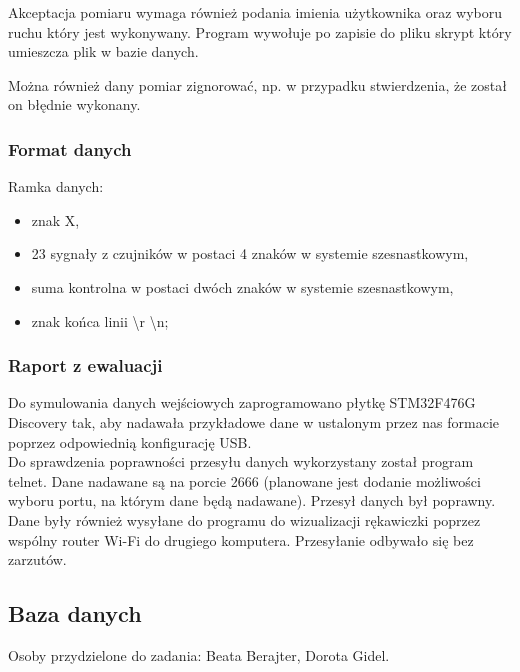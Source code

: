 \documentclass{article}
\begin{document}
Akceptacja pomiaru wymaga również podania imienia użytkownika oraz wyboru ruchu który jest wykonywany. Program wywołuje po zapisie do pliku skrypt który umieszcza plik w bazie danych.

Można również dany pomiar zignorować, np. w przypadku stwierdzenia, że został on błędnie wykonany.

\subsubsection{Format danych}
Ramka danych:
\begin{itemize}
    \item znak X,
    \item 23 sygnały z czujników w postaci 4 znaków w systemie szesnastkowym,
    \item suma kontrolna w postaci dwóch znaków w systemie szesnastkowym,
    \item znak końca linii \textbackslash r \textbackslash n;
\end{itemize}

\subsubsection{Raport z ewaluacji}
Do symulowania danych wejściowych zaprogramowano płytkę STM32F476G Discovery tak, aby nadawała przykładowe dane w ustalonym przez nas formacie poprzez odpowiednią konfigurację USB. \\
Do sprawdzenia poprawności przesyłu danych wykorzystany został program telnet. Dane nadawane są na porcie 2666 (planowane jest dodanie możliwości wyboru portu, na którym dane będą nadawane). Przesył danych był poprawny. \\
Dane były również wysyłane do programu do wizualizacji rękawiczki poprzez wspólny router Wi-Fi do drugiego komputera. Przesyłanie odbywało się bez zarzutów.

\subsection{Baza danych}
Osoby przydzielone do zadania: Beata Berajter, Dorota Gidel.
\end{document}
